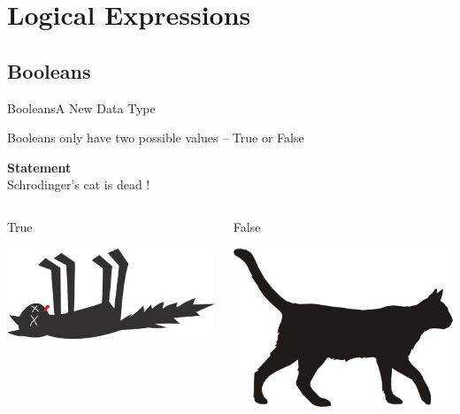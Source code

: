 \section{Logical Expressions}

\subsection{Booleans}
\begin{frame}[fragile]{Booleans}{A New Data Type}
    \begin{block}{}
        Booleans only have two possible values -- True or False
    \end{block}
    {\Large \textbf{Statement}\\ Schrodinger's cat is dead !}
    \begin{columns}[c]
            \begin{block}{True}
            \begin{center}
                \includegraphics[width=\linewidth]{images/dead_cat.jpg}
            \end{center}
            \end{block}
            \begin{block}{False}
            \begin{center}
                \includegraphics[width=\linewidth]{images/cat.jpg}
            \end{center}
            \end{block}
    \end{columns}
\end{frame}

